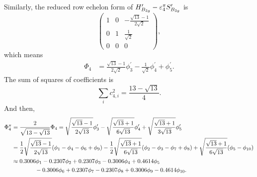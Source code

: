 		Similarly, the reduced row echelon form of $H^\prime_{B_{3g}}-\varepsilon^\pi_4 S^\prime_{B_{3g}}$ is
		\begin{equation*}
			\begin{pmatrix}
				1	& 0	&	-\frac{\sqrt{13}-1}{2\sqrt{2}}	\\	0	&	1	&	\frac{1}{\sqrt{2}}	\\	0	&	0	&	0
			\end{pmatrix},
		\end{equation*}		
		which means
		\begin{align*}
			\Phi_4 &= \frac{\sqrt{13}-1}{2\sqrt{2}}\phi^\prime_3 - \frac{1}{\sqrt{2}} \phi^\prime_4 + \phi^\prime_5.
		\end{align*}
		The sum of squares of coefficients is
		\begin{equation*}
			\sum_{i} c^2_{4,i} = \frac{13-\sqrt{13}}{4}.
		\end{equation*}
		And then,
		\begin{align}
			\Phi^\pi_4 &= \frac{2}{\sqrt{13-\sqrt{13}}} \Phi_4 = \sqrt{\frac{\sqrt{13}-1}{2\sqrt{13}}} \phi^\prime_3 - \sqrt{\frac{\sqrt{13}+1}{6\sqrt{13}}} \phi^\prime_4	+ \sqrt{\frac{\sqrt{13}+1}{3\sqrt{13}}} \phi^\prime_5\notag \\
			&= \frac{1}{2}\sqrt{\frac{\sqrt{13}-1}{2\sqrt{13}}}(\phi_1 - \phi_4 - \phi_6 + \phi_9) - \frac{1}{2}\sqrt{\frac{\sqrt{13}+1}{6\sqrt{13}}} (\phi_2 - \phi_3 - \phi_7 + \phi_8) \notag + \sqrt{\frac{\sqrt{13}+1}{6\sqrt{13}}} (\phi_5 -\phi_{10})  \\
			&\approx 0.3006 \phi_1 - 0.2307 \phi_2 + 0.2307 \phi_3 -0.3006 \phi_4 + 0.4614 \phi_5 \notag \\
			&\hspace*{4em} - 0.3006\phi_6 + 0.2307 \phi_7 - 0.2307 \phi_8 + 0.3006 \phi_9 - 0.4614 \phi_{10}.
		\end{align}
		
